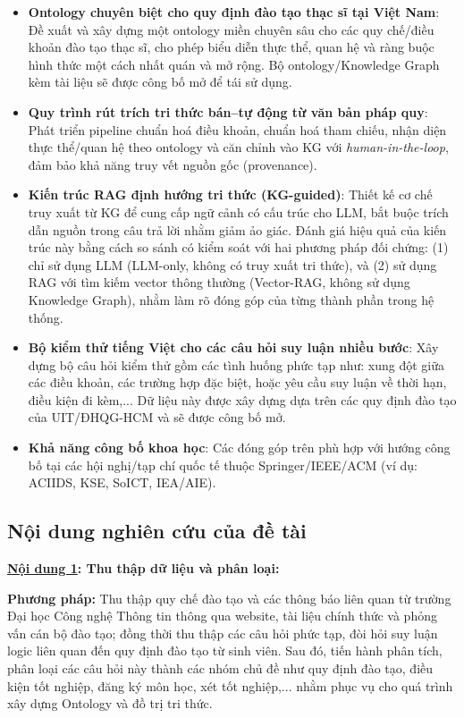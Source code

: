 \documentclass[a4paper,12pt]{article}
\begin{document}
\begin{itemize}
    \item \textbf{Ontology chuyên biệt cho quy định đào tạo thạc sĩ tại Việt Nam}: Đề xuất và xây dựng một ontology miền chuyên sâu cho các quy chế/điều khoản đào tạo thạc sĩ, cho phép biểu diễn thực thể, quan hệ và ràng buộc hình thức một cách nhất quán và mở rộng. Bộ ontology/Knowledge Graph kèm tài liệu sẽ được công bố mở để tái sử dụng.

    \item \textbf{Quy trình rút trích tri thức bán–tự động từ văn bản pháp quy}: Phát triển pipeline chuẩn hoá điều khoản, chuẩn hoá tham chiếu, nhận diện thực thể/quan hệ theo ontology và căn chỉnh vào KG với \emph{human-in-the-loop}, đảm bảo khả năng truy vết nguồn gốc (provenance).

    \item \textbf{Kiến trúc RAG định hướng tri thức (KG-guided)}: Thiết kế cơ chế truy xuất từ KG để cung cấp ngữ cảnh có cấu trúc cho LLM, bắt buộc trích dẫn nguồn trong câu trả lời nhằm giảm ảo giác. Đánh giá hiệu quả của kiến trúc này bằng cách so sánh có kiểm soát với hai phương pháp đối chứng: (1) chỉ sử dụng LLM (LLM-only, không có truy xuất tri thức), và (2) sử dụng RAG với tìm kiếm vector thông thường (Vector-RAG, không sử dụng Knowledge Graph), nhằm làm rõ đóng góp của từng thành phần trong hệ thống.

    \item \textbf{Bộ kiểm thử tiếng Việt cho các câu hỏi suy luận nhiều bước}: Xây dựng bộ câu hỏi kiểm thử gồm các tình huống phức tạp như: xung đột giữa các điều khoản, các trường hợp đặc biệt, hoặc yêu cầu suy luận về thời hạn, điều kiện đi kèm,... Dữ liệu này được xây dựng dựa trên các quy định đào tạo của UIT/ĐHQG-HCM và sẽ được công bố mở.

    \item \textbf{Khả năng công bố khoa học}: Các đóng góp trên phù hợp với hướng công bố tại các hội nghị/tạp chí quốc tế thuộc Springer/IEEE/ACM (ví dụ: ACIIDS, KSE, SoICT, IEA/AIE).
\end{itemize}

\subsection{Nội dung nghiên cứu của đề tài}

\textbf{\uline{Nội dung 1}: Thu thập dữ liệu và phân loại:}

\textbf{Phương pháp:} Thu thập quy chế đào tạo và các thông báo liên quan từ trường Đại học Công nghệ Thông tin thông qua website, tài liệu chính thức và phỏng vấn cán bộ đào tạo; đồng thời thu thập các câu hỏi phức tạp, đòi hỏi suy luận logic liên quan đến quy định đào tạo từ sinh viên. Sau đó, tiến hành phân tích, phân loại các câu hỏi này thành các nhóm chủ đề như quy định đào tạo, điều kiện tốt nghiệp, đăng ký môn học, xét tốt nghiệp,... nhằm phục vụ cho quá trình xây dựng Ontology và đồ trị tri thức.
    
\end{document}
